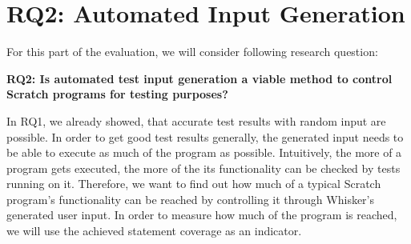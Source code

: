 
\section{RQ2: Automated Input Generation}
\label{sec:rq2}


For this part of the evaluation, we will consider following research question:

\begin{center}\begin{minipage}{.9\textwidth}
    \textbf{RQ2: Is automated test input generation a viable method to control Scratch programs for testing purposes?}
\end{minipage}\end{center}

\noindent In RQ1, we already showed, that accurate test results with random input are possible.
In order to get good test results generally, the generated input needs to be able to execute as much of the program as possible.
Intuitively, the more of a program gets executed, the more of the its functionality can be checked by tests running on it.
Therefore, we want to find out how much of a typical Scratch program's functionality can be reached by controlling it through Whisker's generated user input.
In order to measure how much of the program is reached, we will use the achieved statement coverage as an indicator.
\parspace

